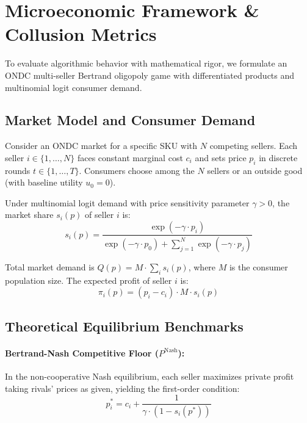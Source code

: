 \documentclass[11pt,a4paper]{article}
\begin{document}
\section{Microeconomic Framework \& Collusion Metrics}

To evaluate algorithmic behavior with mathematical rigor, we formulate an ONDC multi-seller Bertrand oligopoly game with differentiated products and multinomial logit consumer demand.

\subsection{Market Model and Consumer Demand}

Consider an ONDC market for a specific SKU with $N$ competing sellers. Each seller $i \in \{1, \dots, N\}$ faces constant marginal cost $c_i$ and sets price $p_i$ in discrete rounds $t \in \{1, \dots, T\}$. Consumers choose among the $N$ sellers or an outside good (with baseline utility $u_0 = 0$).

Under multinomial logit demand with price sensitivity parameter $\gamma > 0$, the market share $s_i(p)$ of seller $i$ is:
\begin{equation}
s_i(p) = \frac{\exp(-\gamma \cdot p_i)}{\exp(-\gamma \cdot p_0) + \sum_{j=1}^N \exp(-\gamma \cdot p_j)}
\end{equation}

Total market demand is $Q(p) = M \cdot \sum_i s_i(p)$, where $M$ is the consumer population size. The expected profit of seller $i$ is:
\begin{equation}
\pi_i(p) = (p_i - c_i) \cdot M \cdot s_i(p)
\end{equation}

\subsection{Theoretical Equilibrium Benchmarks}

\paragraph{Bertrand-Nash Competitive Floor ($P^{\text{Nash}}$):} In the non-cooperative Nash equilibrium, each seller maximizes private profit taking rivals' prices as given, yielding the first-order condition:
\begin{equation}
p_i^* = c_i + \frac{1}{\gamma \cdot (1 - s_i(p^*))}
\end{equation}
\end{document}
